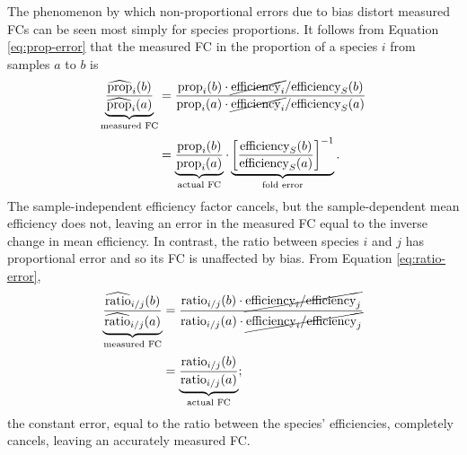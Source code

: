 \documentclass[
]{article}
\begin{document}
The phenomenon by which non-proportional errors due to bias distort measured FCs can be seen most simply for species proportions.
It follows from Equation \eqref{eq:prop-error} that the measured FC in the proportion of a species \(i\) from samples \(a\) to \(b\) is
\begin{align}
  \label{eq:prop-fc-error}
\underbrace{\frac{\widehat{\text{prop}}_{i}(b)}{\widehat{\text{prop}}_{i}(a)}} _\text{measured FC}
  &= \frac
    {\text{prop}_{i}(b) \cdot \cancel{\text{efficiency}_{i}} / {\text{efficiency}_S(b)}}
    {\text{prop}_{i}(a) \cdot \cancel{\text{efficiency}_{i}} / {\text{efficiency}_S(a)}}
\\[0.5ex]
  &=
  \underbrace{\frac{\text{prop}_{i}(b)}{\text{prop}_{i}(a)}}_\text{actual FC}
  \cdot
  \underbrace{\left[\frac{\text{efficiency}_S(b)}{\text{efficiency}_S(a)}\right]^{-1}}_\text{fold error}
  .
\end{align}
The sample-independent efficiency factor cancels, but the sample-dependent mean efficiency does not, leaving an error in the measured FC equal to the inverse change in mean efficiency.
In contrast, the ratio between species \(i\) and \(j\) has proportional error and so its FC is unaffected by bias.
From Equation \eqref{eq:ratio-error},
\begin{align}
  \label{eq:ratio-fc-error}
\underbrace{\frac{\widehat{\text{ratio}}_{i/j}(b)}{\widehat{\text{ratio}}_{i/j}(a)}} _\text{measured FC}
  &= \frac
    {\text{ratio}_{i/j}(b) \cdot \cancel{\text{efficiency}_{i} / {\text{efficiency}_j}}}
    {\text{ratio}_{i/j}(a) \cdot \cancel{\text{efficiency}_{i} / {\text{efficiency}_j}}}
\\[0.5ex]
  &=
  \underbrace{\frac{\text{ratio}_{i/j}(b)}{\text{ratio}_{i/j}(a)}}_\text{actual FC}
  ;
\end{align}
the constant error, equal to the ratio between the species' efficiencies, completely cancels, leaving an accurately measured FC.
\end{document}
